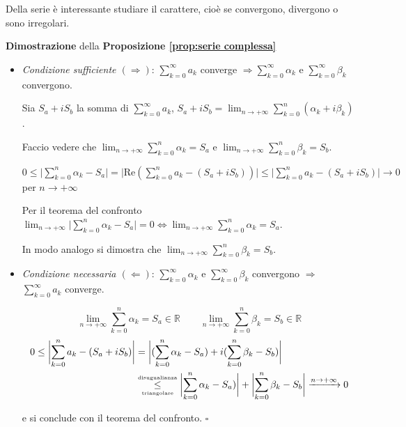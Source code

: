 Della serie è interessante studiare il carattere, cioè se convergono, divergono o sono irregolari.

\begin{dembar}
	\textbf{Dimostrazione} della \textbf{Proposizione \ref{prop:serie complessa}} 
	\begin{itemize}
		\item \textit{Condizione sufficiente $(\Rightarrow)$}: $\sum_{k=0}^\infty a_k$ converge $\Rightarrow \sum_{k=0}^\infty \alpha_k$ e $\sum_{k=0}^\infty \beta_k$ convergono. 
		
		Sia $S_a + iS_b$ la somma di $\sum_{k=0}^\infty a_k$, $S_a + iS_b = \lim_{n\rightarrow+\infty} \sum_{k=0}^n (\alpha_k + i\beta_k)$.
		
		Faccio vedere che $\lim_{n\rightarrow+\infty} \sum_{k=0}^n \alpha_k = S_a$ e $\lim_{n\rightarrow+\infty} \sum_{k=0}^n \beta_k = S_b$.
		
		$0 \leq \biggl|\sum_{k=0}^n \alpha_k - S_a \biggr| = \biggl|\mathrm{Re}(\sum_{k=0}^n a_k - (S_a + iS_b)) \biggr| \leq \biggl| \sum_{k=0}^n a_k - (S_a + iS_b) \biggr| \rightarrow 0$ per $n\rightarrow+\infty$
		
		Per il teorema del confronto $\lim_{n\rightarrow+\infty} \biggl| \sum_{k=0}^n \alpha_k -S_a \biggr| = 0 \iff \lim_{n\rightarrow+\infty} \sum_{k=0}^n \alpha_k = S_a$.
		
		In modo analogo si dimostra che $\lim_{n\rightarrow+\infty} \sum_{k=0}^n \beta_k = S_b$.
		
		\vspace{5pt}
		
		\item \textit{Condizione necessaria $(\Leftarrow)$}: 
		$\sum_{k=0}^\infty \alpha_k$ e $\sum_{k=0}^\infty \beta_k$ convergono $\Rightarrow$ $\sum_{k=0}^\infty a_k$ converge. 
		
		\begin{equation*}
			\lim_{n\rightarrow+\infty} \sum_{k=0}^n \alpha_k = S_a \in \mathbb{R} \qquad \lim_{n\rightarrow+\infty} \sum_{k=0}^n \beta_k = S_b \in \mathbb{R}
		\end{equation*}
		\begin{align*}
			0 \leq \biggl| \sum_{k=0}^n a_k - (S_a + iS_b) \biggr|
			&= \biggl| (\sum_{k=0}^n \alpha_k -S_a) + i(\sum_{k=0}^n \beta_k - S_b) \biggr| \\
			& \underset{\mbox{\tiny{triangolare}}}{\stackrel{\mbox{\tiny{disugualianza}}}{\leq}} \biggl| \sum_{k=0}^n \alpha_k -S_a) \biggr| + \biggl| \sum_{k=0}^n \beta_k - S_b \biggr| \xrightarrow{n\rightarrow+\infty}  0 
		\end{align*}
		
		e si conclude con il teorema del confronto. $\square$
	\end{itemize}
\end{dembar}


